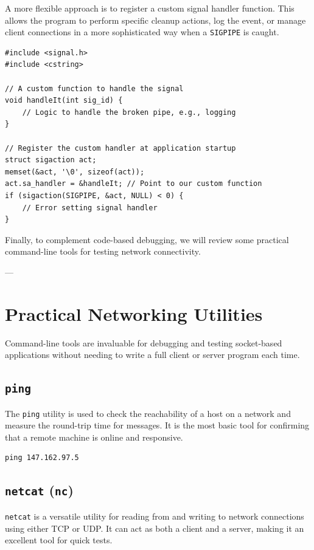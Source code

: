 \documentclass{article}
\begin{document}
A more flexible approach is to register a custom signal handler function. This allows the program to perform specific cleanup actions, log the event, or manage client connections in a more sophisticated way when a \texttt{SIGPIPE} is caught.

\begin{verbatim}
#include <signal.h>
#include <cstring>

// A custom function to handle the signal
void handleIt(int sig_id) {
    // Logic to handle the broken pipe, e.g., logging
}

// Register the custom handler at application startup
struct sigaction act;
memset(&act, '\0', sizeof(act));
act.sa_handler = &handleIt; // Point to our custom function
if (sigaction(SIGPIPE, &act, NULL) < 0) {
    // Error setting signal handler
}
\end{verbatim}

Finally, to complement code-based debugging, we will review some practical command-line tools for testing network connectivity.

---

\section[Practical Networking Utilities]{Practical Networking Utilities}

Command-line tools are invaluable for debugging and testing socket-based applications without needing to write a full client or server program each time.

\subsection{\texttt{ping}}

The \texttt{ping} utility is used to check the reachability of a host on a network and measure the round-trip time for messages. It is the most basic tool for confirming that a remote machine is online and responsive.

\begin{verbatim}
ping 147.162.97.5
\end{verbatim}

\subsection{\texttt{netcat} (\texttt{nc})}

\texttt{netcat} is a versatile utility for reading from and writing to network connections using either TCP or UDP. It can act as both a client and a server, making it an excellent tool for quick tests.
\end{document}
